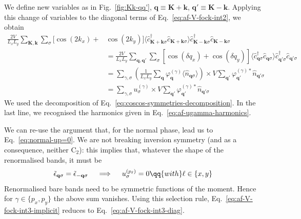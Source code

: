 \begin{tabproof}
	
	We define new variables as in Fig.~\ref{fig:Kk-qq'}, $\mathbf{q}\equiv\mathbf{K}+\mathbf{k}$, $\mathbf{q}'\equiv\mathbf{K}-\mathbf{k}$.
	Applying this change of variables to the diagonal terms of Eq.~\eqref{eq:af-V-fock-int2}, we obtain
	\begin{align}
		\frac{2V}{L_x L_y} \sum_{\mathbf{K}, \mathbf{k}} \sum_\sigma [
		\cos \left(
		2k_x
		\right)	+ &\cos \left(
		2k_y
		\right)	
		] \langle
		\hat c_{\mathbf{K}+\mathbf{k} \sigma}^\dagger 
		\hat c_{\mathbf{K}+\mathbf{k} \sigma}
		\rangle
		\hat c_{\mathbf{K}-\mathbf{k} \sigma}^\dagger \hat c_{\mathbf{K}-\mathbf{k}\sigma} \nonumber \\
		&= \frac{2V}{L_x L_y} \sum_{\mathbf{q}, \mathbf{q}'} \sum_\sigma \left[
		\cos \left( \delta q_x \right) + \cos \left( \delta q_y \right)
		\right] \langle
		\hat c_{\mathbf{q}\sigma}^\dagger \hat c_{\mathbf{q}\sigma} 
		\rangle
		\hat c_{\mathbf{q}'\sigma}^\dagger \hat c_{\mathbf{q}'\sigma}
		\nonumber \\
		&= \sum_{\gamma,\sigma} \left(
		\frac{1}{L_x L_y} \sum_\mathbf{q} \varphi_\mathbf{q}^{(\gamma)}
		\langle
		\hat n_{\mathbf{q}\sigma}
		\rangle
		\right) \times V
		\sum_{\mathbf{q}'}
		\varphi_{\mathbf{q}'}^{(\gamma)*}
		\hat n_{\mathbf{q}'\sigma} \nonumber \\ 
		&= \sum_{\gamma,\sigma} u_\sigma^{(\gamma)} \times V
		\sum_{\mathbf{q}'}
		\varphi_{\mathbf{q}'}^{(\gamma)*}
		\hat n_{\mathbf{q}'\sigma}
		\label{eq:af-V-fock-int3-implicit}
	\end{align}
	We used the decomposition of Eq.~\eqref{eq:coscos-symmetries-decomposition}. In the last line, we recognised the harmonics given in Eq.~\eqref{eq:af-ugamma-harmonics}.
	
	We can re-use the argument that, for the normal phase, lead us to Eq.~\eqref{eq:normal-up=0}. We are not breaking inversion symmetry (and as a consequence, neither $\mathrm{C}_2$): this implies that, whatever the shape of the renormalised bands, it must be
	\[
	\tilde{\epsilon}_{\mathbf{q}\sigma} = \tilde{\epsilon}_{-\mathbf{q}\sigma}
	\quad\implies\quad
	u^{(p_\ell)}_\sigma = 0
	\qq{with}
	\ell\in\lbrace x,y \rbrace
	\]
	Renormalised bare bands need to be symmetric functions of the moment. Hence for $\gamma\in\lbrace p_x, p_y \rbrace$ the above sum vanishes. Using this selection rule, Eq.~\eqref{eq:af-V-fock-int3-implicit} reduces to Eq.~\eqref{eq:af-V-fock-int3-diag}.
	
\end{tabproof}
	
